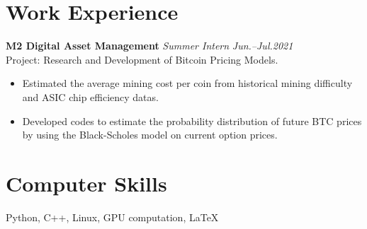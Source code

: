 \documentclass[11pt,a4paper,roman]{moderncv}        %
\begin{document}
\section{Work Experience}

\textbf{M2 Digital Asset Management} \textit{Summer Intern} \hfill \textit{Jun.--Jul.2021}
\vspace*{1mm}\\
{Project: Research and Development of Bitcoin Pricing Models.}
\vspace*{1mm}
\begin{itemize}
	\item Estimated the average mining cost per coin from historical mining difficulty and ASIC chip efficiency datas.
	\item Developed codes to estimate the probability distribution of future BTC prices by using the Black-Scholes model on current option prices.
\end{itemize}

\section{Computer Skills}
{Python, C++, Linux, GPU computation, \LaTeX}
\end{document}
